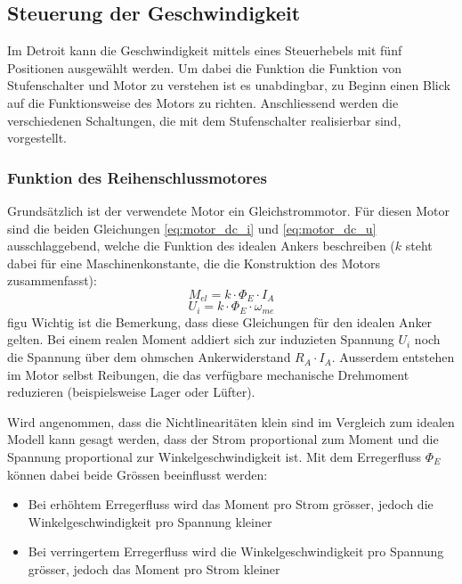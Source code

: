 \subsection{Steuerung der Geschwindigkeit}

Im Detroit kann die Geschwindigkeit mittels eines Steuerhebels mit fünf Positionen ausgewählt werden. Um dabei die Funktion die Funktion von Stufenschalter und Motor zu verstehen ist es unabdingbar, zu Beginn einen Blick auf die Funktionsweise des Motors zu richten. Anschliessend werden die verschiedenen Schaltungen, die mit dem Stufenschalter realisierbar sind, vorgestellt.

\subsubsection{Funktion des Reihenschlussmotores}

Grundsätzlich ist der verwendete Motor ein Gleichstrommotor. Für diesen Motor sind die beiden Gleichungen \ref{eq:motor_dc_i} und \ref{eq:motor_dc_u} ausschlaggebend, welche die Funktion des idealen Ankers beschreiben ($k$ steht dabei für eine Maschinenkonstante, die die Konstruktion des Motors zusammenfasst):
\begin{equation}
	M_{el}=k\cdot\Phi_E\cdot I_A
\label{eq:motor_dc_i}
\end{equation}
\begin{equation}
	U_i=k\cdot\Phi_E\cdot\omega_{me}
\label{eq:motor_dc_u}
\end{equation}figu
Wichtig ist die Bemerkung, dass diese Gleichungen für den idealen Anker gelten. Bei einem realen Moment addiert sich zur induzieten Spannung $U_i$ noch die Spannung über dem ohmschen Ankerwiderstand $R_A\cdot I_A$. Ausserdem entstehen im Motor selbst Reibungen, die das verfügbare mechanische Drehmoment reduzieren (beispielsweise Lager oder Lüfter).

Wird angenommen, dass die Nichtlinearitäten klein sind im Vergleich zum idealen Modell kann gesagt werden, dass der Strom proportional zum Moment und die Spannung proportional zur Winkelgeschwindigkeit ist. Mit dem Erregerfluss $\Phi_E$ können dabei beide Grössen beeinflusst werden: \begin{itemize}
	\item Bei erhöhtem Erregerfluss wird das Moment pro Strom grösser, jedoch die Winkelgeschwindigkeit pro Spannung kleiner
	\item Bei verringertem Erregerfluss wird die Winkelgeschwindigkeit pro Spannung grösser, jedoch das Moment pro Strom kleiner
\end{itemize}

